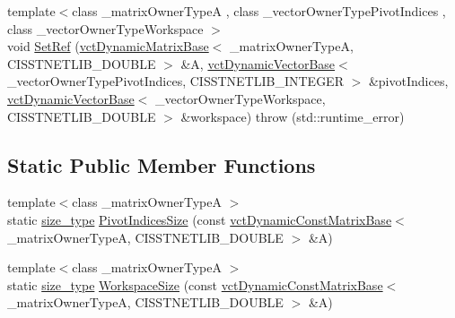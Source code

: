 \begin{DoxyCompactItemize}
\item 
{\footnotesize template$<$class \+\_\+matrix\+Owner\+Type\+A , class \+\_\+vector\+Owner\+Type\+Pivot\+Indices , class \+\_\+vector\+Owner\+Type\+Workspace $>$ }\\void \hyperlink{classnmr_inverse_dynamic_data_a63ba1f6ac432d51a55e029277fb025ed}{Set\+Ref} (\hyperlink{classvct_dynamic_matrix_base}{vct\+Dynamic\+Matrix\+Base}$<$ \+\_\+matrix\+Owner\+Type\+A, C\+I\+S\+S\+T\+N\+E\+T\+L\+I\+B\+\_\+\+D\+O\+U\+B\+L\+E $>$ \&A, \hyperlink{classvct_dynamic_vector_base}{vct\+Dynamic\+Vector\+Base}$<$ \+\_\+vector\+Owner\+Type\+Pivot\+Indices, C\+I\+S\+S\+T\+N\+E\+T\+L\+I\+B\+\_\+\+I\+N\+T\+E\+G\+E\+R $>$ \&pivot\+Indices, \hyperlink{classvct_dynamic_vector_base}{vct\+Dynamic\+Vector\+Base}$<$ \+\_\+vector\+Owner\+Type\+Workspace, C\+I\+S\+S\+T\+N\+E\+T\+L\+I\+B\+\_\+\+D\+O\+U\+B\+L\+E $>$ \&workspace)  throw (std\+::runtime\+\_\+error)
\end{DoxyCompactItemize}
\subsection*{Static Public Member Functions}
\begin{DoxyCompactItemize}
\item 
{\footnotesize template$<$class \+\_\+matrix\+Owner\+Type\+A $>$ }\\static \hyperlink{classnmr_inverse_dynamic_data_aeb5c2317adf50d8fc7952a9b38bf0129}{size\+\_\+type} \hyperlink{classnmr_inverse_dynamic_data_ab327168662ab28ad8ae94e3b08acb7e7}{Pivot\+Indices\+Size} (const \hyperlink{classvct_dynamic_const_matrix_base}{vct\+Dynamic\+Const\+Matrix\+Base}$<$ \+\_\+matrix\+Owner\+Type\+A, C\+I\+S\+S\+T\+N\+E\+T\+L\+I\+B\+\_\+\+D\+O\+U\+B\+L\+E $>$ \&A)
\item 
{\footnotesize template$<$class \+\_\+matrix\+Owner\+Type\+A $>$ }\\static \hyperlink{classnmr_inverse_dynamic_data_aeb5c2317adf50d8fc7952a9b38bf0129}{size\+\_\+type} \hyperlink{classnmr_inverse_dynamic_data_ae35f9f1621272764b8e2b057410a9eeb}{Workspace\+Size} (const \hyperlink{classvct_dynamic_const_matrix_base}{vct\+Dynamic\+Const\+Matrix\+Base}$<$ \+\_\+matrix\+Owner\+Type\+A, C\+I\+S\+S\+T\+N\+E\+T\+L\+I\+B\+\_\+\+D\+O\+U\+B\+L\+E $>$ \&A)
\end{DoxyCompactItemize}
